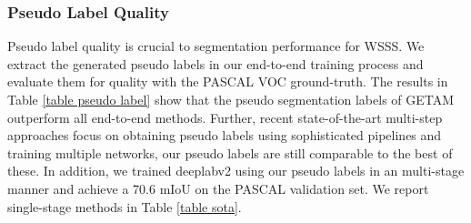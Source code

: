 \documentclass[10pt,twocolumn,letterpaper]{article}
\begin{document}
\begin{table}[t!]
\footnotesize
\centering{}
\caption{Pseudo label mIoU on PASCAL VOC \textit{train} and \textit{val} set. Our results are obtained on ViT-Hybrid~\cite{dosovitskiy2020image}.
}
\label{table pseudo label}
\end{table}




\subsubsection{Pseudo Label Quality}
\label{sec:pseudo_label}
Pseudo label quality is crucial to segmentation performance for WSSS. 
We extract the generated pseudo labels in our end-to-end training process and evaluate them for quality with the PASCAL VOC ground-truth.
The results in Table \ref{table pseudo label} show that 
the pseudo segmentation labels of GETAM outperform all end-to-end methods. 
Further, recent state-of-the-art multi-step approaches focus on obtaining pseudo labels using sophisticated pipelines and training multiple networks, our pseudo labels are still comparable to the best of these. 
In addition, we trained deeplabv2 \cite{chen2017deeplab} using our pseudo labels in an multi-stage manner
and achieve a 70.6 mIoU on the PASCAL validation set.
We report single-stage methods in Table \ref{table sota}.
\end{document}
